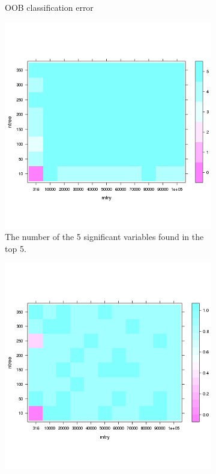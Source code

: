 \documentclass[10pt,letterpaper]{article}
\begin{document}
\begin{figure}[tbhp]
\begin{adjustwidth}{-1.00in}{0in}
\begin{subfigure}[b]{0.5\linewidth}
    \caption{OOB classification error} 
    \label{fig7:b} 
    \vspace{4ex}
  \end{subfigure} 
  \begin{subfigure}[b]{0.5\linewidth}
    \centering
    \includegraphics[totalheight=8cm]{./figs/numnber_of_variables_found.png} 
    \caption{The number of the 5 significant variables found in the top 5.} 
    \label{fig7:a} 
    \vspace{4ex}
  \end{subfigure}%
  \begin{subfigure}[b]{0.5\linewidth}
    \centering
    \includegraphics[totalheight=8cm]{./figs/rbo.png}

\end{subfigure}
\end{adjustwidth}
\end{figure}
\end{document}
